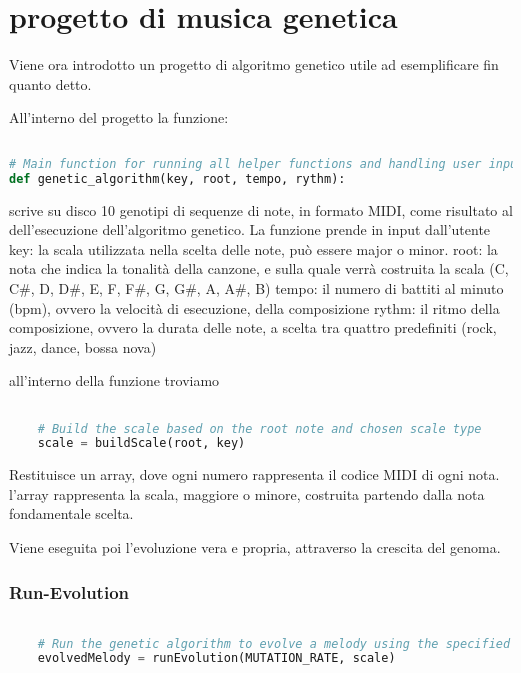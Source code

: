 \documentclass[a4paper,12pt]{report}
\begin{document}
\chapter{progetto di musica genetica}

Viene ora introdotto un progetto di algoritmo genetico utile ad esemplificare fin quanto detto.

All'interno del progetto la funzione:

\begin{lstlisting}[language=Python]
 
# Main function for running all helper functions and handling user input.
def genetic_algorithm(key, root, tempo, rythm):

\end{lstlisting}

scrive su disco 10 genotipi di sequenze di note, in formato MIDI, come risultato al dell'esecuzione dell'algoritmo genetico.
La funzione prende in input dall'utente
key: la scala utilizzata nella scelta delle note, può essere major o minor.
root: la nota che indica la tonalità della canzone, e sulla quale verrà costruita la scala (C, C#, D, D#, E, F, F#, G, G#, A, A#, B)
tempo: il numero di battiti al minuto (bpm), ovvero la velocità di esecuzione, della composizione
rythm: il ritmo della composizione, ovvero la durata delle note, a scelta tra quattro predefiniti (rock, jazz, dance, bossa nova)

all'interno della funzione troviamo

\begin{lstlisting}[language=Python]

    # Build the scale based on the root note and chosen scale type
    scale = buildScale(root, key)

\end{lstlisting}

Restituisce un array, dove ogni numero rappresenta il codice MIDI di ogni nota. l'array rappresenta la scala, maggiore o minore, costruita partendo dalla nota fondamentale scelta.

Viene eseguita poi l'evoluzione vera e propria, attraverso la crescita del genoma.

\subsection{Run-Evolution}

\begin{lstlisting}[language=Python]

    # Run the genetic algorithm to evolve a melody using the specified mutation rate and scale
    evolvedMelody = runEvolution(MUTATION_RATE, scale)

\end{lstlisting}
\end{document}
